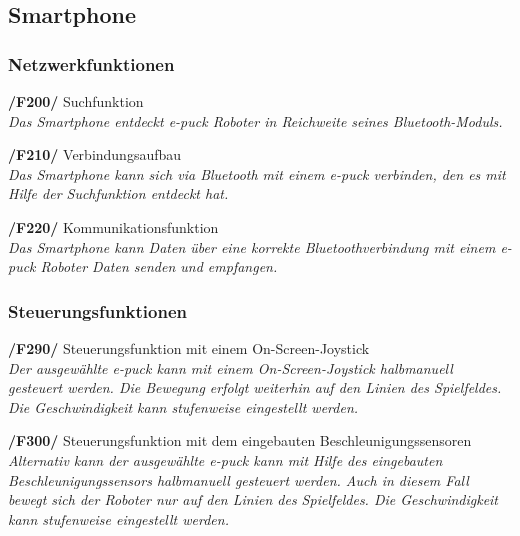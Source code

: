 \documentclass[10pt,a4paper]{article}
\begin{document}
		\subsection{Smartphone}
			\subsubsection{Netzwerkfunktionen}
				\begin{list}{}{\leftmargin=1cm}
					\item[\textbf{/F200/}] Suchfunktion
						\\ \textsl{Das Smartphone entdeckt e-puck Roboter in Reichweite seines Bluetooth-Moduls.}
					\item[\textbf{/F210/}] Verbindungsaufbau
						\\ \textsl{Das Smartphone kann sich via Bluetooth mit einem e-puck verbinden, den es mit Hilfe
						der Suchfunktion entdeckt hat.}				
					\item[\textbf{/F220/}] Kommunikationsfunktion
						\\ \textsl{Das Smartphone kann Daten über eine korrekte Bluetoothverbindung mit einem e-puck Roboter Daten senden und
							empfangen.}
				\end{list}
			\subsubsection{Steuerungsfunktionen}		
				\begin{list}{}{\leftmargin=1cm}
					\item[\textbf{/F290/}] Steuerungsfunktion mit einem On-Screen-Joystick
						\\ \textsl{Der ausgewählte e-puck kann mit einem On-Screen-Joystick halbmanuell gesteuert werden. Die Bewegung
							erfolgt weiterhin auf den Linien des Spielfeldes. Die Geschwindigkeit kann stufenweise eingestellt werden.}	
					\item[\textbf{/F300/}] Steuerungsfunktion mit dem eingebauten Beschleunigungssensoren
						\\ \textsl{Alternativ kann der ausgewählte e-puck kann mit Hilfe des eingebauten Beschleunigungssensors halbmanuell
						gesteuert werden. Auch in diesem Fall bewegt sich der Roboter nur auf den Linien des Spielfeldes. Die Geschwindigkeit
						kann stufenweise eingestellt werden.}					
				\end{list}					
\end{document}
